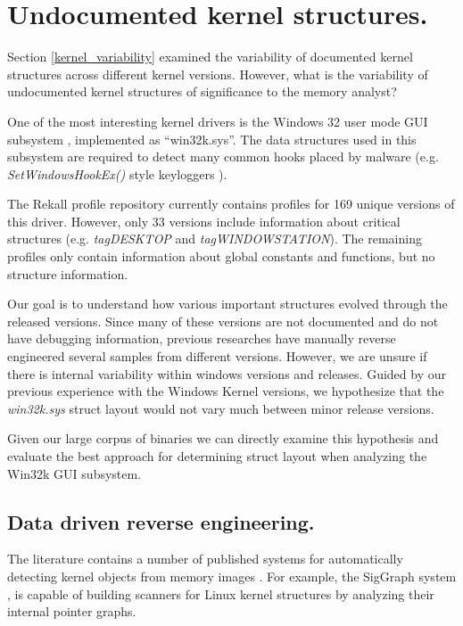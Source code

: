 \section{Undocumented kernel structures.}
\label{undocumented}

Section \ref{kernel_variability} examined the variability of documented kernel
structures across different kernel versions. However, what is the variability of
undocumented kernel structures of significance to the memory analyst?

One of the most interesting kernel drivers is the Windows 32 user mode GUI
subsystem \citep{mandt2011kernel,yuan2001windows}, implemented as
``win32k.sys''. The data structures used in this subsystem are required to
detect many common hooks placed by malware (e.g. {\em SetWindowsHookEx()} style
keyloggers \citep{Sikorski:2012:PMA:2181153}).

The Rekall profile repository currently contains profiles for 169 unique
versions of this driver. However, only 33 versions include information about
critical structures (e.g. {\em tagDESKTOP} and {\em tagWINDOWSTATION}). The
remaining profiles only contain information about global constants and
functions, but no structure information.

Our goal is to understand how various important structures evolved through the
released versions. Since many of these versions are not documented and do not
have debugging information, previous researches have manually reverse engineered
several samples from different versions. However, we are unsure if there is
internal variability within windows versions and releases. Guided by our
previous experience with the Windows Kernel versions, we hypothesize that the
{\em win32k.sys} struct layout would not vary much between minor release
versions.

Given our large corpus of binaries we can directly examine this hypothesis and
evaluate the best approach for determining struct layout when analyzing the
Win32k GUI subsystem.

\subsection{Data driven reverse engineering.}
\label{data_driven_reversing}

The literature contains a number of published systems for automatically
detecting kernel objects from memory images \citep{sun2012reversing}. For
example, the SigGraph system \citep{lin2011siggraph}, is capable of building
scanners for Linux kernel structures by analyzing their internal pointer graphs.

